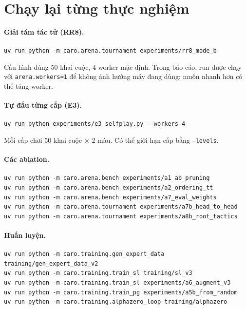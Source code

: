 \section{Chạy lại từng thực nghiệm}
\paragraph{Giải tám tác tử (RR8).}
\begin{lstlisting}[numbers=none]
uv run python -m caro.arena.tournament experiments/rr8_mode_b
\end{lstlisting}
Cấu hình dùng 50 khai cuộc, 4 worker mặc định. Trong báo cáo, run được chạy với
\texttt{arena.workers=1} để không ảnh hưởng máy đang dùng; muốn nhanh hơn có thể tăng worker.

\paragraph{Tự đấu từng cấp (E3).}
\begin{lstlisting}[numbers=none]
uv run python experiments/e3_selfplay.py --workers 4
\end{lstlisting}
Mỗi cấp chơi 50 khai cuộc × 2 màu. Có thể giới hạn cấp bằng \texttt{--levels}.

\paragraph{Các ablation.}
\begin{lstlisting}[numbers=none]
uv run python -m caro.arena.bench experiments/a1_ab_pruning
uv run python -m caro.arena.bench experiments/a2_ordering_tt
uv run python -m caro.arena.bench experiments/a7_eval_weights
uv run python -m caro.arena.tournament experiments/a7b_head_to_head
uv run python -m caro.arena.tournament experiments/a8b_root_tactics
\end{lstlisting}

\paragraph{Huấn luyện.}
\begin{lstlisting}[numbers=none]
uv run python -m caro.training.gen_expert_data training/gen_expert_data_v2
uv run python -m caro.training.train_sl training/sl_v3
uv run python -m caro.training.train_sl experiments/a6_augment_v3
uv run python -m caro.training.train_pg experiments/a5b_from_random
uv run python -m caro.training.alphazero_loop training/alphazero
\end{lstlisting}

